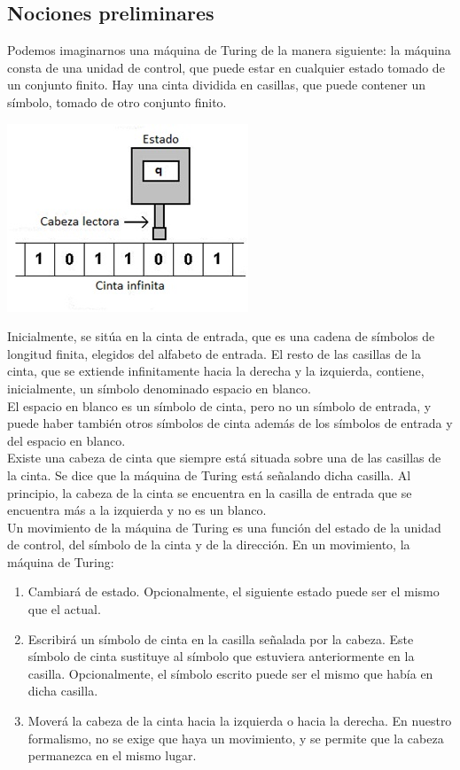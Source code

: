\documentclass[12pt,a4paper,spanish]{book}
\begin{document}
\subsection{Nociones preliminares}
Podemos imaginarnos una m\'aquina de Turing de la manera siguiente: la m\'aquina
consta de una unidad de control, que puede estar en cualquier estado tomado de un
conjunto finito. Hay una cinta dividida en casillas, que puede contener un s\'imbolo,
tomado de otro conjunto finito.
\begin{center}
\includegraphics{turi1.jpg}
\end{center}
Inicialmente, se sit\'ua en la cinta de entrada, que es una cadena de s\'imbolos de
longitud finita, elegidos del alfabeto de entrada. El resto de las casillas de la cinta,
que se extiende infinitamente hacia la derecha y la izquierda, contiene, inicialmente,
un s\'imbolo denominado espacio en blanco.\\ El espacio en blanco es un s\'imbolo de
cinta, pero no un s\'imbolo de entrada, y puede haber tambi\'en otros s\'imbolos de
cinta adem\'as de los s\'imbolos de entrada y del espacio en blanco.\\
Existe una cabeza de cinta que siempre est\'a situada sobre una de las casillas de
la cinta. Se dice que la m\'aquina de Turing est\'a se\~nalando dicha casilla. Al
principio, la cabeza de la cinta se encuentra en la casilla de entrada que se encuentra
m\'as a la izquierda y no es un blanco.\\
Un movimiento de la m\'aquina de Turing es una funci\'on del estado de la unidad de
control, del s\'imbolo de la cinta y de la direcci\'on. En un movimiento, la m\'aquina de
Turing:
\begin{enumerate}
\item Cambiar\'a de estado. Opcionalmente, el siguiente estado puede ser el mismo
que el actual.
\item Escribir\'a un s\'imbolo de cinta en la casilla se\~nalada por la cabeza. Este
s\'imbolo de cinta sustituye al s\'imbolo que estuviera anteriormente en la casilla.
Opcionalmente, el s\'imbolo escrito puede ser el mismo que hab\'ia en dicha casilla.
\item Mover\'a la cabeza de la cinta hacia la izquierda o hacia la derecha. En nuestro
formalismo, no se exige que haya un movimiento, y se permite que la cabeza
permanezca en el mismo lugar.
\end{enumerate}
\end{document}
